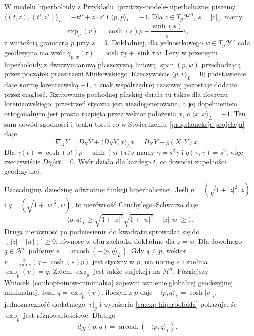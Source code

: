 \begin{przyklad}
W modelu hiperboloidy z
Przykładu~\ref{prz:trzy-modele-hiperboliczne}
piszemy $\langle(t,z),(t',z')\rangle_L
=-tt'+z\cdot z'$ i $\langle p,p\rangle_L=-1$.
Dla $v\in T_p\mathcal H^n$, $s=|v|_g$, mamy
\begin{equation}\label{eq:exp-hiperboloida}
 \exp_p(v)=\cosh(s)p+\frac{\sinh(s)}{s}v,
\end{equation}
z wartością graniczną $p$ przy $s=0$.
Dokładniej, dla jednostkowego $w\in T_p\mathcal H^n$
cała geodezyjna ma wzór
$\gamma_{p,w}(\tau)=\cosh\tau\,p+\sinh\tau\,w$.
Leży w przecięciu hiperboloidy z dwuwymiarową
płaszczyzną liniową $\operatorname{span}(p,w)$
przechodzącą przez początek przestrzeni Minkowskiego.
Rzeczywiście $\langle p,v\rangle_L=0$;
podstawienie daje normę lorentzowską $-1$,
a znak współrzędnej czasowej pozostaje dodatni przez ciągłość.
Rzutowanie pochodnej płaskiej działa tu także dla iloczynu
lorentzowskiego: przestrzeń styczna jest niezdegenerowana,
a jej dopełnieniem ortogonalnym jest prosta rozpięta przez
wektor położenia $x$, o $\langle x,x\rangle_L=-1$.
Ten sam dowód zgodności i braku torsji co w
Stwierdzeniu~\ref{prop:koneksja-projekcja} daje
\[
 \nabla_XY=D_XY+\langle D_XY,x\rangle_Lx
          =D_XY-g(X,Y)x.
\]
Dla $\gamma(t)=\cosh(st)p+\sinh(st)v/s$ mamy
$\ddot\gamma=s^2\gamma$ i $g(\dot\gamma,\dot\gamma)=s^2$,
więc rzeczywiście $D\dot\gamma/\dd t=0$.
Wzór działa dla każdego $t$, co dowodzi zupełności geodezyjnej.

Uzasadnijmy dziedzinę odwrotnej funkcji hiperbolicznej.
Jeśli $p=(\sqrt{1+|z|^2},z)$ i $q=(\sqrt{1+|w|^2},w)$,
to nierówność Cauchy'ego--Schwarza daje
\[
 -\langle p,q\rangle_L
 \geq\sqrt{1+|z|^2}\sqrt{1+|w|^2}-|z|\,|w|\geq1.
\]
Druga nierówność po podniesieniu do kwadratu sprowadza się
do $(|z|-|w|)^2\geq0$; równość w obu zachodzi dokładnie
dla $z=w$. Dla dowolnego $q\in\mathcal H^n$ połóżmy
$s=\operatorname{arcosh}(-\langle p,q\rangle_L)$.
Gdy $q\ne p$, wektor
$v=\frac{s}{\sinh s}(q-\cosh(s)p)$
jest styczny w $p$, ma normę $s$ i spełnia
$\exp_p(v)=q$. Zatem $\exp_p$ jest także
surjekcją na $\mathcal H^n$.
Późniejszy Wniosek~\ref{cor:hopf-rinow-minimalna}
zapewni istnienie globalnej geodezyjnej minimalnej.
Jeśli $q=\exp_p(v)$, iloczyn z $p$ daje
$-\langle p,q\rangle_L=\cosh|v|_g$;
jednoznaczność dodatniego $|v|_g$
i wyrażenia \eqref{eq:exp-hiperboloida} pokazuje,
że $\exp_p$ jest różnowartościowe. Dlatego
\begin{equation}\label{eq:odleglosc-hiperboloida}
 d_{\mathcal H}(p,q)
 =\operatorname{arcosh}(-\langle p,q\rangle_L).
\end{equation}


\end{przyklad}
